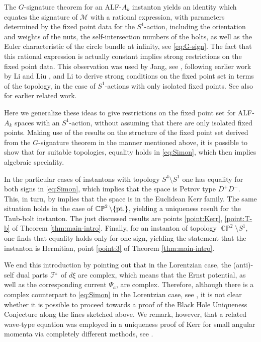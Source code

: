 \documentclass[a4paper,10pt,reqno]{amsart}
\newcommand{\cM}{\mathcal{M}}
\theoremstyle{plain}
\DeclareMathOperator{\CP}{\mathbb{C}\mathbb{P}}
\newcommand{\PM}[1]{{{#1}^{\hspace{-.5pt}\scaleto{\pm}{3.5pt}}}}
\def\Fcal{\mathcal{F}}
\numberwithin{equation}{section}
\begin{document}
The $G$-signature theorem for an ALF-$A_k$ instanton yields an identity which equates the signature of $\cM$ with a rational expression, with parameters determined by the fixed point data for the $S^1$-action, including the orientation and weights of the nuts, the self-intersection numbers of the bolts, as well as the Euler characteristic of the circle bundle at infinity, see \eqref{eq:G-sign}. The fact that this rational expression is actually constant implies strong restrictions on the fixed point data. This observation was used by Jang, see \cite{2018JGP...133..181J}, following earlier work by Li and Liu \cite{2010arXiv1012.1507L}, and Li \cite{MR3343967} to derive strong conditions on the fixed point set in terms of the topology, in the case of $S^1$-actions with only isolated fixed points. See also \cite{MR1201437} for earlier related work. 

Here we generalize these ideas to give restrictions on the fixed point set for ALF-$A_k$ spaces with an $S^1$-action, without assuming that there are only isolated fixed points.  Making use of the results on the structure of the fixed point set derived from the $G$-signature theorem in the manner mentioned above, it is possible to show that for suitable topologies, equality holds in \eqref{eq:Simon}, which then implies algebraic speciality. 

In the particular cases of instantons with topology $S^4\setminus S^1$ one has equality for both signs in \eqref{eq:Simon}, which implies that the space is Petrov type $D^+D^-$. This, in turn, by \cite{Biquard:Gauduchon}  implies that the space is in the Euclidean Kerr family. The same situation holds in the case of $\CP^2 \setminus \{\text{\rm pt.}\}$, yielding a uniqueness result for the Taub-bolt instanton. The just discussed results are points \ref{point:Kerr}, \ref{point:T-b} of Theorem \ref{thm:main-intro}. Finally, for an instanton of topology $\CP^2 \setminus S^1$, one finds that equality holds only for one sign, yielding the statement that the instanton is Hermitian, point \ref{point:3} of Theorem \ref{thm:main-intro}.  

We end this introduction by pointing out that in the Lorentzian case, the (anti)-self dual parts $\PM{\Fcal}$ of $d\xi$ are complex, which means that the Ernst potential, as well as the corresponding current $\Psi_a$, are complex. Therefore, although there is a complex counterpart to \eqref{eq:Simon} in the Lorentzian case, see \cite{MR747036}, it is not clear whether it is possible to proceed towards a proof of the Black Hole Uniqueness Conjecture along the lines sketched above. We remark, however, that a related wave-type equation was employed in a uniqueness proof of Kerr for small angular momenta via completely different methods, see \cite{MR2672799,MR2461426}. 
\end{document}
